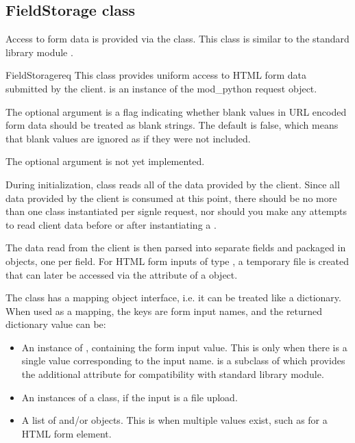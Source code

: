 \subsection{FieldStorage class\label{pyapi-util-fstor}}

Access to form data is provided via the 
class. This class is similar to the standard library module
 .

\begin{classdesc}{FieldStorage}{req}
This class provides uniform access to HTML form data submitted by the
client.   is an instance of the mod_python request object.

The optional argument  is a flag indicating
whether blank values in URL encoded form data should be treated as
blank strings. The default is false, which means that blank values are
ignored as if they were not included.

The optional argument  is not yet implemented.

During initialization,  class reads all of the
data provided by the client. Since all data provided by the client is
consumed at this point, there should be no more than one
 class instantiated per signle request, nor should
you make any attempts to read client data before or after
instantiating a .

The data read from the client is then parsed into separate fields and
packaged in  objects, one per field. For HTML form inputs
of type , a temporary file is created that can later be
accessed via the  attribute of a  object.

The  class has a mapping object interface, i.e. it
can be treated like a dictionary. When used as a mapping, the keys are
form input names, and the returned dictionary value can be:

\begin{itemize}
\item
An instance of , containing the form input
value. This is only when there is a single value corresponding to the
input name.  is a subclass of  which
provides the additional  attribute for compatibility
with standard library  module.
\item
An instances of a  class, if the input is a file upload.
\item
A list of  and/or  objects. This is
when multiple values exist, such as for a  HTML form
element.
\end{itemize}


\end{classdesc}
